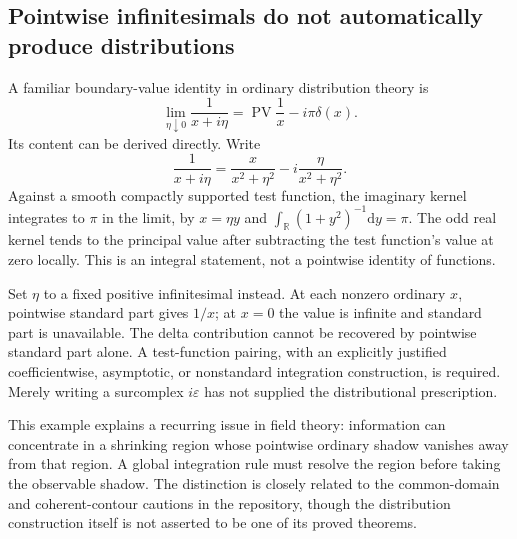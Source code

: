 \documentclass[11pt,a4paper]{article}
\numberwithin{equation}{section}
\theoremstyle{definition}
\theoremstyle{remark}
\newcommand{\R}{\mathbb R}
\newcommand{\eps}{\varepsilon}
\newcommand{\dd}{\mathrm d}
\DeclareMathOperator{\PV}{PV}
\begin{document}
\subsection{Pointwise infinitesimals do not automatically produce distributions}
A familiar boundary-value identity in ordinary distribution theory is
\begin{equation}\label{eq:distribution}
 \lim_{\eta\downarrow0}\frac1{x+i\eta}
 =\PV\frac1x-i\pi\delta(x).
\end{equation}
Its content can be derived directly. Write
\begin{equation}
 \frac1{x+i\eta}=\frac{x}{x^2+\eta^2}
 -i\frac{\eta}{x^2+\eta^2}.
\end{equation}
Against a smooth compactly supported test function, the imaginary kernel integrates to $\pi$ in the limit, by $x=\eta y$ and $\int_\R(1+y^2)^{-1}\dd y=\pi$. The odd real kernel tends to the principal value after subtracting the test function's value at zero locally. This is an integral statement, not a pointwise identity of functions.

Set $\eta$ to a fixed positive infinitesimal instead. At each nonzero ordinary $x$, pointwise standard part gives $1/x$; at $x=0$ the value is infinite and standard part is unavailable. The delta contribution cannot be recovered by pointwise standard part alone. A test-function pairing, with an explicitly justified coefficientwise, asymptotic, or nonstandard integration construction, is required. Merely writing a surcomplex $i\eps$ has not supplied the distributional prescription.

This example explains a recurring issue in field theory: information can concentrate in a shrinking region whose pointwise ordinary shadow vanishes away from that region. A global integration rule must resolve the region before taking the observable shadow. The distinction is closely related to the common-domain and coherent-contour cautions in the repository, though the distribution construction itself is not asserted to be one of its proved theorems.
\end{document}
